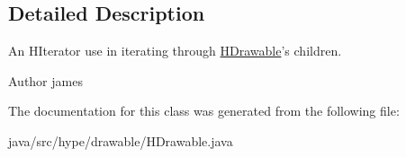 \subsection{Detailed Description}
An H\-Iterator use in iterating through \hyperlink{classhype_1_1drawable_1_1_h_drawable}{H\-Drawable}'s children. 

\begin{DoxyAuthor}{Author}
james 
\end{DoxyAuthor}


The documentation for this class was generated from the following file\-:\begin{DoxyCompactItemize}
\item 
java/src/hype/drawable/H\-Drawable.\-java\end{DoxyCompactItemize}
